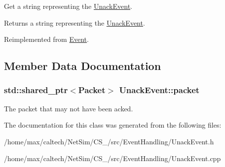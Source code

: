 \-Get a string representing the \hyperlink{classUnackEvent}{\-Unack\-Event}. 

\begin{DoxyReturn}{\-Returns}
a string representing the \hyperlink{classUnackEvent}{\-Unack\-Event}. 
\end{DoxyReturn}


\-Reimplemented from \hyperlink{classEvent_a924194a887aa70888e08a04b69389bd6}{\-Event}.



\subsection{\-Member \-Data \-Documentation}
\hypertarget{classUnackEvent_ad9d09191d5ee31c15c554e797a708f7d}{
\subsubsection[{packet}]{\setlength{\rightskip}{0pt plus 5cm}std\-::shared\-\_\-ptr$<${\bf \-Packet}$>$ {\bf \-Unack\-Event\-::packet}}}\label{classUnackEvent_ad9d09191d5ee31c15c554e797a708f7d}


\-The packet that may not have been acked. 



\-The documentation for this class was generated from the following files\-:\begin{DoxyCompactItemize}
\item 
/home/max/caltech/\-Net\-Sim/\-C\-S\-\_/src/\-Event\-Handling/\-Unack\-Event.\-h\item 
/home/max/caltech/\-Net\-Sim/\-C\-S\-\_/src/\-Event\-Handling/\-Unack\-Event.\-cpp\end{DoxyCompactItemize}
